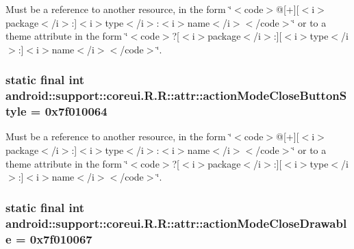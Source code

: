 Must be a reference to another resource, in the form \char`\"{}$<$code$>$@\mbox{[}+\mbox{]}\mbox{[}$<$i$>$package$<$/i$>$:\mbox{]}$<$i$>$type$<$/i$>$:$<$i$>$name$<$/i$>$$<$/code$>$\char`\"{} or to a theme attribute in the form \char`\"{}$<$code$>$?\mbox{[}$<$i$>$package$<$/i$>$:\mbox{]}\mbox{[}$<$i$>$type$<$/i$>$:\mbox{]}$<$i$>$name$<$/i$>$$<$/code$>$\char`\"{}. \hypertarget{classandroid_1_1support_1_1coreui_1_1_r_1_1attr_7213928bfa2085620b8a5b229f5dfa89}{
\subsubsection[{actionModeCloseButtonStyle}]{\setlength{\rightskip}{0pt plus 5cm}static final int android::support::coreui.R.R::attr::actionModeCloseButtonStyle = 0x7f010064}}
\label{classandroid_1_1support_1_1coreui_1_1_r_1_1attr_7213928bfa2085620b8a5b229f5dfa89}


Must be a reference to another resource, in the form \char`\"{}$<$code$>$@\mbox{[}+\mbox{]}\mbox{[}$<$i$>$package$<$/i$>$:\mbox{]}$<$i$>$type$<$/i$>$:$<$i$>$name$<$/i$>$$<$/code$>$\char`\"{} or to a theme attribute in the form \char`\"{}$<$code$>$?\mbox{[}$<$i$>$package$<$/i$>$:\mbox{]}\mbox{[}$<$i$>$type$<$/i$>$:\mbox{]}$<$i$>$name$<$/i$>$$<$/code$>$\char`\"{}. \hypertarget{classandroid_1_1support_1_1coreui_1_1_r_1_1attr_b76a514660186b5b3241aa70f06a3c0c}{
\subsubsection[{actionModeCloseDrawable}]{\setlength{\rightskip}{0pt plus 5cm}static final int android::support::coreui.R.R::attr::actionModeCloseDrawable = 0x7f010067}}
\label{classandroid_1_1support_1_1coreui_1_1_r_1_1attr_b76a514660186b5b3241aa70f06a3c0c}


